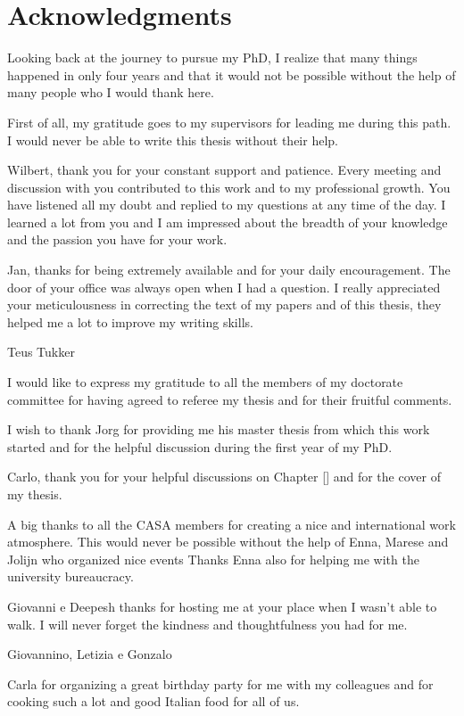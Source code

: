 \clearpage{\pagestyle{empty}\cleardoublepage}

\chapter*{Acknowledgments}
\markboth{}{}
Looking back at the journey to pursue my PhD, I realize that many things happened in only four years and that it would not be possible without the help of many people who I would thank here. 

First of all, my gratitude goes to my supervisors for leading me during this path. I would never be able to write this thesis without their help.

Wilbert, thank you for your constant support and patience. Every meeting and discussion with you contributed to this work and to my professional growth. 
You have listened all my doubt and replied to my questions at any time of the day.
I learned a lot from you and I am impressed about the breadth of your knowledge and the passion you have for your work. 

Jan, thanks for being extremely available and for your daily encouragement. The door of your office was always open when I had a question. 
I really appreciated your meticulousness in correcting the text of my papers and of this thesis, they helped me a lot to improve my writing skills.

Teus Tukker

I would like to express my gratitude to all the members of my doctorate committee for having agreed to referee my thesis and for their fruitful comments.  

I wish to thank Jorg for providing me his master thesis from which this work started and for the helpful discussion during the first year of my PhD.

Carlo, thank you for your helpful discussions on Chapter \ref{} and for the cover of my thesis.  %

A big thanks to all the CASA members for creating a nice and international work atmosphere. This would never be possible without the help of Enna, Marese and Jolijn who organized nice events 
Thanks Enna also for helping me with the university bureaucracy.


Giovanni e Deepesh thanks for hosting me at your place when I wasn't able to walk. I will never forget the kindness and thoughtfulness you had for me.

Giovannino, Letizia e Gonzalo

Carla for organizing a great birthday party for me with my colleagues and for cooking such a lot and good Italian food for all of us.

